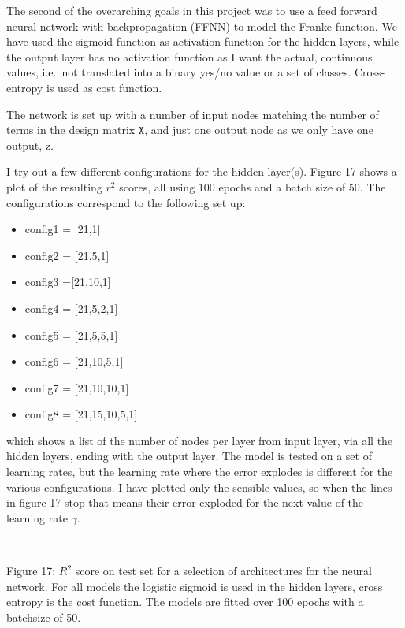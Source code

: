 \documentclass[11pt]{article}
\begin{document}
The second of the overarching goals in this project was to use a feed
forward neural network with backpropagation (FFNN) to model the Franke
function. We have used the sigmoid function as activation function for
the hidden layers, while the output layer has no activation function as
I want the actual, continuous values, i.e.~not translated into a binary
yes/no value or a set of classes. Cross-entropy is used as cost
function.

The network is set up with a number of input nodes matching the number
of terms in the design matrix \(\texttt{X}\), and just one output node
as we only have one output, z.

I try out a few different configurations for the hidden layer(s). Figure
17 shows a plot of the resulting \(r^2\) scores, all using 100 epochs
and a batch size of 50. The configurations correspond to the following
set up: 

\begin{itemize}
	\item config1 = {[}21,1{]}
	\item config2 = {[}21,5,1{]}
	\item config3 ={[}21,10,1{]}
	\item config4 = {[}21,5,2,1{]}
	\item config5 = {[}21,5,5,1{]}
	\item config6 = {[}21,10,5,1{]}
	\item config7 = {[}21,10,10,1{]}
	\item config8 =
	{[}21,15,10,5,1{]}
\end{itemize}

which shows a list of the number of nodes per layer from input layer,
via all the hidden layers, ending with the output layer. The model is
tested on a set of learning rates, but the learning rate where the error
explodes is different for the various configurations. I have plotted
only the sensible values, so when the lines in figure 17 stop that means
their error exploded for the next value of the learning rate \(\gamma\).

    \begin{center}
    \end{center}
    { \hspace*{\fill} \\}
    
    Figure 17: \(R^2\) score on test set for a selection of architectures
for the neural network. For all models the logistic sigmoid is used in
the hidden layers, cross entropy is the cost function. The models are
fitted over 100 epochs with a batchsize of 50.
\end{document}
